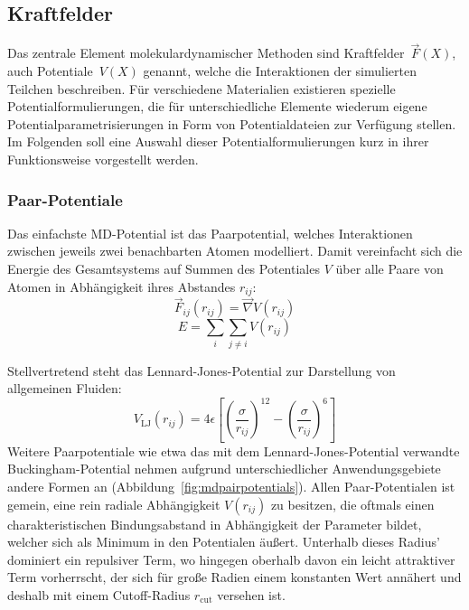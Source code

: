 \subsection{Kraftfelder}
\label{mdforcefields}

Das zentrale Element molekulardynamischer Methoden sind Kraftfelder~$\vec F(X)$, auch Potentiale~$V(X)$ genannt, welche die Interaktionen der simulierten Teilchen beschreiben.
Für verschiedene Materialien existieren spezielle Potentialformulierungen, die für unterschiedliche Elemente wiederum eigene Potentialparametrisierungen in Form von Potentialdateien zur Verfügung stellen.
Im Folgenden soll eine Auswahl dieser Potentialformulierungen kurz in ihrer Funktionsweise vorgestellt werden.

\subsubsection{Paar-Potentiale}

Das einfachste MD-Potential ist das Paarpotential, welches Interaktionen zwischen jeweils zwei benachbarten Atomen modelliert.
Damit vereinfacht sich die Energie des Gesamtsystems auf Summen des Potentiales $V$ über alle Paare von Atomen in Abhängigkeit ihres Abstandes $r_{ij}$:
\begin{equation}
  \vec F_{ij}(r_{ij}) = \vec\nabla V(r_{ij})
\end{equation}
\begin{equation}
  E = \sum_i\sum_{j \neq i}{V(r_{ij})}
\end{equation}

Stellvertretend steht das Lennard-Jones-Potential zur Darstellung von allgemeinen Fluiden:
\begin{equation}
  V_\text{LJ}(r_{ij}) = 4 \epsilon \left[\left(\frac{\sigma}{r_{ij}}\right)^{12} - \left(\frac{\sigma}{r_{ij}}\right)^{6}\right]
\end{equation}
Weitere Paarpotentiale wie etwa das mit dem Lennard-Jones-Potential verwandte Bucking\-ham-Potential nehmen aufgrund unterschiedlicher Anwendungsgebiete andere Formen an (Abbildung~\ref{fig:mdpairpotentials}).
Allen Paar-Potentialen ist gemein, eine rein radiale Abhängigkeit $V(r_{ij})$ zu besitzen, die oftmals einen charakteristischen Bindungsabstand in Abhängigkeit der Parameter bildet, welcher sich als Minimum in den Potentialen äußert.
Unterhalb dieses Radius' dominiert ein repulsiver Term, wo hingegen oberhalb davon ein leicht attraktiver Term vorherrscht, der sich für große Radien einem konstanten Wert annähert und deshalb mit einem Cutoff-Radius $r_\text{cut}$ versehen ist.

